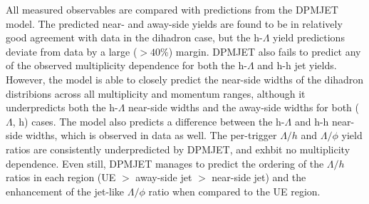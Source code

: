 All measured observables are compared with predictions from the DPMJET model. The predicted near- and away-side yields are found to be in relatively good agreement with data in the dihadron case, but the h-$\Lambda$ yield predictions deviate from data by a large ($>40$\%) margin. DPMJET also fails to predict any of the observed multiplicity dependence for both the h-$\Lambda$ and h-h jet yields. However, the model is able to closely predict the near-side widths of the dihadron distribions across all multiplicity and momentum ranges, although it underpredicts both the h-$\Lambda$ near-side widths and the away-side widths for both ($\Lambda$, h) cases. The model also predicts a difference between the h-$\Lambda$ and h-h near-side widths, which is observed in data as well. The per-trigger $\Lambda/h$ and $\Lambda/\phi$ yield ratios  are consistently underpredicted by DPMJET, and exhbit no multiplicity dependence. Even still, DPMJET manages to predict the ordering of the $\Lambda/h$ ratios in each region (UE $>$ away-side jet $>$ near-side jet) and the enhancement of the jet-like $\Lambda/\phi$ ratio when compared to the UE region. 